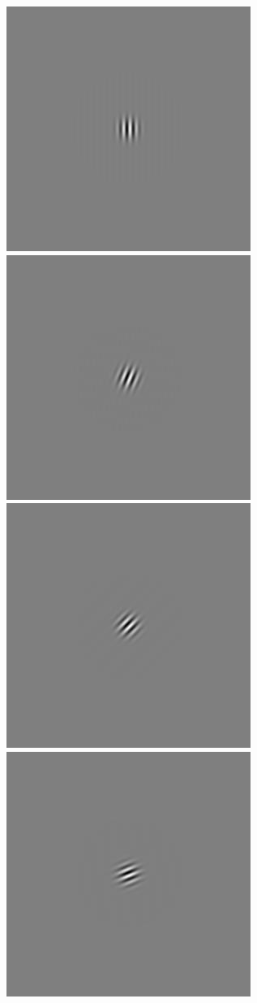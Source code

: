 \begin{figure}
\begin{center}
 \includegraphics[scale=0.1]{ch4/figures/rGabor1_0.jpg}
 \includegraphics[scale=0.1]{ch4/figures/rGabor1_1.jpg}
 \includegraphics[scale=0.1]{ch4/figures/rGabor1_2.jpg}
 \includegraphics[scale=0.1]{ch4/figures/rGabor1_3.jpg}

\end{center}
\end{figure}
